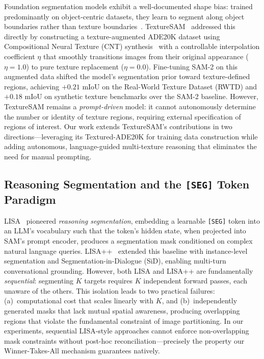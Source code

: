 \documentclass{article}
\begin{document}
Foundation segmentation models exhibit a well-documented shape bias: trained predominantly on object-centric datasets, they learn to segment along object boundaries rather than texture boundaries~\cite{texturesam,kth}. TextureSAM~\cite{texturesam} addressed this directly by constructing a texture-augmented ADE20K dataset using Compositional Neural Texture (CNT) synthesis~\cite{cocostuff} with a controllable interpolation coefficient $\eta$ that smoothly transitions images from their original appearance ($\eta = 1.0$) to pure texture replacement ($\eta = 0.0$). Fine-tuning SAM-2 on this augmented data shifted the model's segmentation prior toward texture-defined regions, achieving $+0.21$ mIoU on the Real-World Texture Dataset (RWTD) and $+0.18$ mIoU on synthetic texture benchmarks over the SAM-2 baseline. However, TextureSAM remains a \emph{prompt-driven} model: it cannot autonomously determine the number or identity of texture regions, requiring external specification of regions of interest. Our work extends TextureSAM's contributions in two directions---leveraging its Textured-ADE20K for training data construction while adding autonomous, language-guided multi-texture reasoning that eliminates the need for manual prompting.

\subsection{Reasoning Segmentation and the \texttt{[SEG]} Token Paradigm}

LISA~\cite{lisa} pioneered \emph{reasoning segmentation}, embedding a learnable \texttt{[SEG]} token into an LLM's vocabulary such that the token's hidden state, when projected into SAM's prompt encoder, produces a segmentation mask conditioned on complex natural language queries. LISA++~\cite{lisapp} extended this baseline with instance-level segmentation and Segmentation-in-Dialogue (SiD), enabling multi-turn conversational grounding. However, both LISA and LISA++ are fundamentally \emph{sequential}: segmenting $K$ targets requires $K$ independent forward passes, each unaware of the others. This isolation leads to two practical failures: (a)~computational cost that scales linearly with $K$, and (b)~independently generated masks that lack mutual spatial awareness, producing overlapping regions that violate the fundamental constraint of image partitioning. In our experiments, sequential LISA-style approaches cannot enforce non-overlapping mask constraints without post-hoc reconciliation---precisely the property our Winner-Takes-All mechanism guarantees natively.
\end{document}
